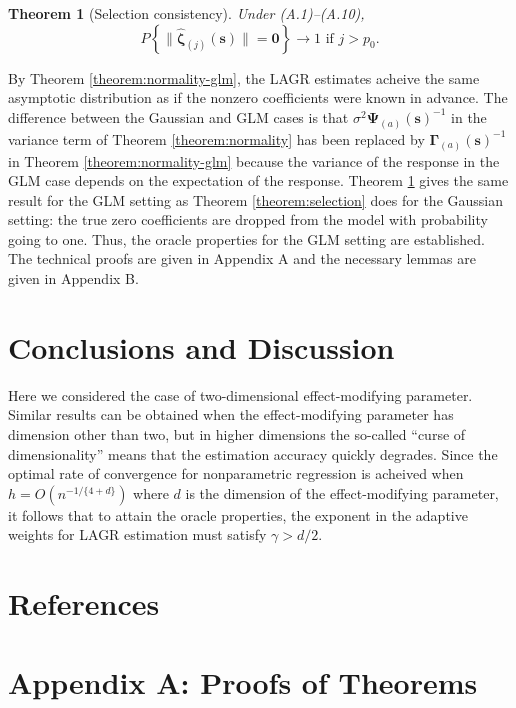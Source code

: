 \documentclass[authoryear,review, 12pt]{elsarticle}
\newtheorem{thm}{Theorem}
\begin{document}
\begin{thm}[Selection consistency]
\label{theorem:selection-glm}  Under (A.1)--(A.10),
\[
P\left\{ \|\hat{\bm{\zeta}}_{(j)}(\bm{s})\|=\bm{0}\right\} \to1\text{ if }j>p_{0}.
\]
 
\end{thm}
By Theorem \ref{theorem:normality-glm}, the LAGR estimates acheive
the same asymptotic distribution as if the nonzero coefficients were
known in advance. The difference between the Gaussian and GLM cases
is that $\sigma^{2}\bm{\Psi}_{(a)}(\bm{s})^{-1}$ in the variance
term of Theorem \ref{theorem:normality} has been replaced by $\bm{\Gamma}_{(a)}(\bm{s})^{-1}$
in Theorem \ref{theorem:normality-glm} because the variance of the
response in the GLM case depends on the expectation of the response.
Theorem \ref{theorem:selection-glm} gives the same result for the
GLM setting as Theorem \ref{theorem:selection} does for the Gaussian
setting: the true zero coefficients are dropped from the model with
probability going to one. Thus, the oracle properties for the GLM
setting are established. The technical proofs are given in Appendix
A and the necessary lemmas are given in Appendix B.


\section{Conclusions and Discussion}

Here we considered the case of two-dimensional effect-modifying parameter.
Similar results can be obtained when the effect-modifying parameter
has dimension other than two, but in higher dimensions the so-called
``curse of dimensionality'' means that the estimation accuracy quickly
degrades. Since the optimal rate of convergence for nonparametric
regression is acheived when $h=O\left(n^{-1/\{4+d\}}\right)$ where
$d$ is the dimension of the effect-modifying parameter, it follows
that to attain the oracle properties, the exponent in the adaptive
weights for LAGR estimation must satisfy $\gamma>d/2$.


\section*{References}



\clearpage
\appendix

\appendix
\section*{Appendix A: Proofs of Theorems}
\end{document}
